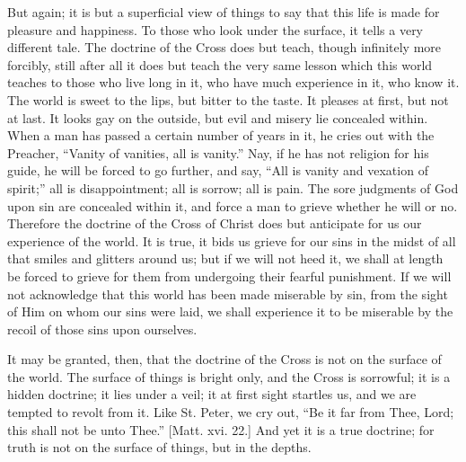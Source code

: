 But again; it is but a superficial view of things to
say that this life is made for pleasure and happiness. To
those who look under the surface, it tells a very
different tale. The doctrine of the Cross does but teach,
though infinitely more forcibly, still after all it does
but teach the very same lesson which this world teaches
to those who live long in it, who have much experience in
it, who know it. The world is sweet to the lips, but
bitter to the taste. It pleases at first, but not at
last. It looks gay on the outside, but evil and misery
lie concealed within. When a man has passed a certain
number of years in it, he cries out with the Preacher,
``Vanity of vanities, all is vanity.'' Nay, if he
has not religion for his guide, he will be forced to go
further, and say, ``All is vanity and vexation of
spirit;'' all is disappointment; all is sorrow; all
is pain. The sore judgments of God upon sin are concealed
within it, and force a man to grieve whether he will or
no. Therefore the doctrine of the Cross of Christ does
but anticipate for us our experience of the world. It is
true, it bids us grieve for our sins in the midst of all
that smiles and glitters around us; but if we will not
heed it, we shall at length be forced to grieve for them
from undergoing their fearful punishment. If we will not
acknowledge that this world has been made miserable by
sin, from the sight of Him on whom our sins were laid, we
shall experience it to be miserable by the recoil of
those sins upon ourselves.

It may be granted, then, that the doctrine of the
Cross is not on the surface of the world. The surface of
things is bright only, and the Cross is sorrowful; it is
a hidden doctrine; it lies under a veil; it at first
sight startles us, and we are tempted to revolt from it.
Like St. Peter, we cry out, ``Be it far from Thee,
Lord; this shall not be unto Thee.'' [Matt. xvi. 22.]
And yet it is a true doctrine; for truth is not on the
surface of things, but in the depths.

